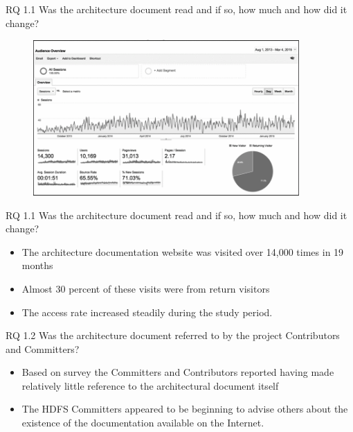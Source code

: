 \documentclass[t,14pt,mathserif]{beamer}
\begin{document}
\begin{frame}{RQ 1.1 Was the architecture document read and if so, how much and how did it change?}
	
	\begin{figure}[!t]
		\centering
		\includegraphics[width=4.0in]{../img/visitors}
		\label{fig:visitors}
	\end{figure}
		
\end{frame}


\begin{frame}{RQ 1.1 Was the architecture document read and if so, how much and how did it change?}
	
	\begin{itemize}
		\item The architecture documentation website was visited over 14,000 times in 19 months
		\item Almost 30 percent of these visits were from return visitors
		\item The access rate increased steadily during the study period.
	\end{itemize}

	
\end{frame}


\begin{frame}{RQ 1.2 Was the architecture document referred to by the project Contributors and Committers?}
	
	\begin{itemize}
		\item Based on survey the Committers and Contributors reported having made relatively little reference to the architectural document itself
		\item The HDFS Committers appeared to be beginning to advise others about the existence of the documentation available on the Internet.
	\end{itemize}

\end{frame}
\end{document}
